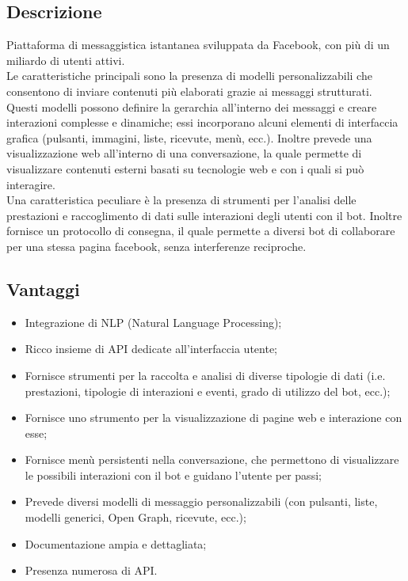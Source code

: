 \documentclass[11pt,notitlepage]{article}
\begin{document}
\subsection*{Descrizione}
Piattaforma di messaggistica istantanea sviluppata da Facebook, con più di un miliardo di utenti attivi. \\
Le caratteristiche principali sono la presenza di modelli personalizzabili che consentono di inviare contenuti più elaborati grazie ai messaggi strutturati. Questi modelli possono definire la gerarchia all'interno dei messaggi e creare interazioni complesse e dinamiche; essi incorporano alcuni elementi di interfaccia grafica (pulsanti, immagini, liste, ricevute, menù, ecc.). Inoltre prevede una visualizzazione web all'interno di una conversazione, la quale permette di visualizzare contenuti esterni basati su tecnologie web e con i quali si può interagire. \\
Una caratteristica peculiare è la presenza di strumenti per l'analisi delle prestazioni e raccoglimento di dati sulle interazioni degli utenti con il bot. Inoltre fornisce un protocollo di consegna, il quale permette a diversi bot di collaborare per una stessa pagina facebook, senza interferenze reciproche.

\subsection*{Vantaggi}
\begin{itemize}
		\item Integrazione di NLP (Natural Language Processing);
		\item Ricco insieme di API dedicate all'interfaccia utente; 
		\item Fornisce strumenti per la raccolta e analisi di diverse tipologie di dati (i.e. prestazioni, tipologie di interazioni e eventi, grado di utilizzo del bot, ecc.);
		\item Fornisce uno strumento per la visualizzazione di pagine web e interazione con esse;
		\item Fornisce menù persistenti nella conversazione, che permettono di visualizzare le possibili interazioni con il bot e guidano l'utente per passi;
		\item Prevede diversi modelli di messaggio personalizzabili (con pulsanti, liste, modelli generici, Open Graph, ricevute, ecc.);
		\item Documentazione ampia e dettagliata;
		\item Presenza numerosa di API.
\end{itemize} 
\end{document}
